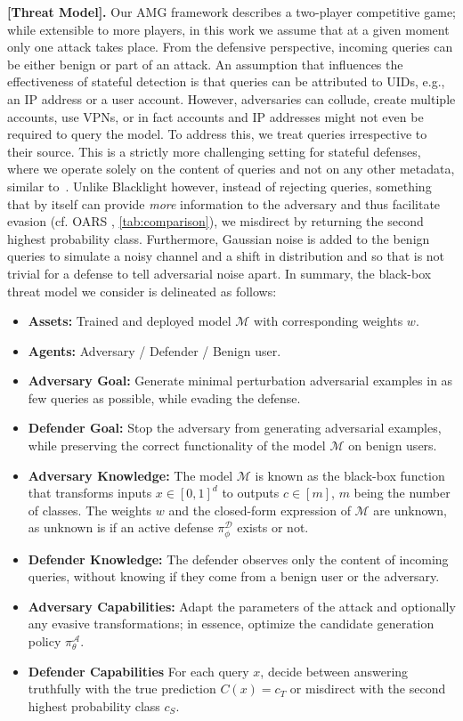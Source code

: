 \textbf{[Threat Model].} Our AMG framework describes a two-player competitive game; while extensible to more players, in this work we assume that at a given moment only one attack takes place.
From the defensive perspective, incoming queries can be either benign or part of an attack.
An assumption that influences the effectiveness of stateful detection is that queries can be attributed to UIDs, e.g., an IP address or a user account.
However, adversaries can collude, create multiple accounts, use VPNs, or in fact accounts and IP addresses might not even be required to query the model.
To address this, we treat queries irrespective to their source.
This is a strictly more challenging setting for stateful defenses, where we operate solely on the content of queries and not on any other metadata, similar to~\cite{li2022blacklight}.
Unlike Blacklight however, instead of rejecting queries, something that by itself can provide \textit{more} information to the adversary and thus facilitate evasion (cf. OARS \cite{feng2023stateful}, \autoref{tab:comparison}), we misdirect by returning the second highest probability class.
Furthermore, Gaussian noise is added to the benign queries to simulate a noisy channel and a shift in distribution and so that is not trivial for a defense to tell adversarial noise apart.
In summary, the black-box threat model we consider is delineated as follows:

\begin{itemize}
    \item \textbf{Assets:} Trained and deployed model $\mathcal{M}$ with corresponding weights ${w}$.
    \item \textbf{Agents:} Adversary / Defender / Benign user.
    \item \textbf{Adversary Goal:} Generate minimal perturbation adversarial examples in as few queries as possible, while evading the defense.
    \item \textbf{Defender Goal:} Stop the adversary from generating adversarial examples, while preserving the correct functionality of the model $\mathcal{M}$ on benign users.
    \item \textbf{Adversary Knowledge:} The model $\mathcal{M}$ is known as the black-box function that transforms inputs $x \in [0,1]^d$ to outputs $c \in [m]$, $m$ being the number of classes. The weights ${w}$ and the closed-form expression of $\mathcal{M}$ are unknown, as unknown is if an active defense $\pi_\phi^{\mathcal{D}}$ exists or not.
    \item \textbf{Defender Knowledge:} The defender observes only the content of incoming queries, without knowing if they come from a benign user or the adversary.
    \item \textbf{Adversary Capabilities:} Adapt the parameters of the attack and optionally any evasive transformations; in essence, optimize the candidate generation policy $\pi^{\mathcal{A}}_\theta$.
    \item \textbf{Defender Capabilities} For each query $x$, decide between answering truthfully with the true prediction $C(x) = c_T$ or misdirect with the second highest probability class $c_S$.
\end{itemize}

